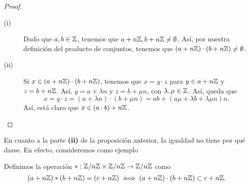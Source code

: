 \begin{proof}
\begin{description}
\item[(i)] Dado que $\displaystyle a,b \in \mathbb{Z} $, tenemos que $\displaystyle a + n\mathbb{Z}, b + n\mathbb{Z} \neq \emptyset $. Así, por nuestra definición del producto de conjuntos, tenemos que $\displaystyle \left(a + n\mathbb{Z}\right) \cdot \left(b + n\mathbb{Z}\right) \neq \emptyset $.
\item[(ii)] Si $\displaystyle x \in \left(a + n\mathbb{Z}\right) \cdot \left(b+n\mathbb{Z}\right) $, tenemos que $\displaystyle x = y \cdot z $ para $\displaystyle y \in a + n\mathbb{Z} $ y $\displaystyle z = b + n\mathbb{Z} $. Así, $\displaystyle y = a + \lambda n $ y $\displaystyle z = b + \mu n $, con $\displaystyle \lambda, \mu \in \mathbb{Z} $. Así, queda que 
	\[x = y \cdot z = \left(a + \lambda n\right) \cdot \left(b + \mu n\right) = ab + \left(a\mu + \lambda b +\lambda \mu n\right)n .\]
	Así, está claro que $\displaystyle x \in \left(a \cdot b\right) + n\mathbb{Z} $.
\end{description}
\end{proof}
\begin{observation}
En cuanto a la parte \textbf{(ii)} de la proposición anterior, la igualdad no tiene por qué darse. En efecto, consideremos como ejemplo 
\end{observation}

Definimos la operación $\displaystyle * : \mathbb{Z}/n\mathbb{Z} \times \mathbb{Z}/n\mathbb{Z} \to \mathbb{Z}/n\mathbb{Z} $ como 
\[\left(a + n\mathbb{Z}\right) * \left(b + n\mathbb{Z}\right) = \left(c + n\mathbb{Z}\right) \iff \left(a + n\mathbb{Z}\right) \cdot \left(b + n\mathbb{Z}\right) \subset c + n\mathbb{Z} .\]

